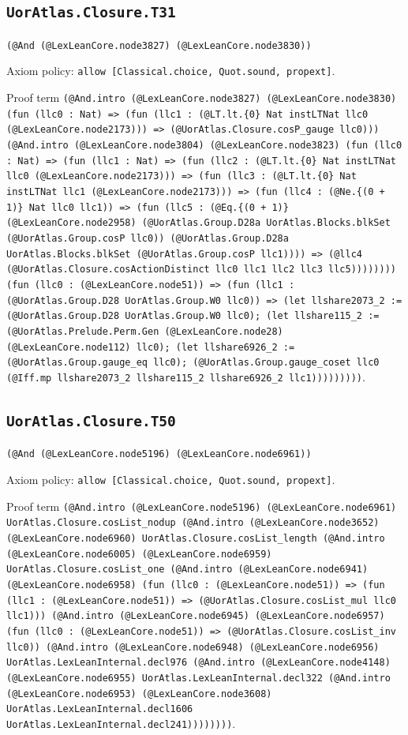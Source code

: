 \documentclass[11pt]{article}
\begin{document}
\subsection*{\texttt{UorAtlas.Closure.T31}}
\noindent\texttt{(@And (@LexLeanCore.node3827) (@LexLeanCore.node3830))}\par
\noindent Axiom policy: \texttt{allow [Classical.choice, Quot.sound, propext]}.\par
\noindent Proof term \texttt{(@And.intro (@LexLeanCore.node3827) (@LexLeanCore.node3830) (fun (llc0 : Nat) => (fun (llc1 : (@LT.lt.\{0\} Nat instLTNat llc0 (@LexLeanCore.node2173))) => (@UorAtlas.Closure.cosP\_gauge llc0))) (@And.intro (@LexLeanCore.node3804) (@LexLeanCore.node3823) (fun (llc0 : Nat) => (fun (llc1 : Nat) => (fun (llc2 : (@LT.lt.\{0\} Nat instLTNat llc0 (@LexLeanCore.node2173))) => (fun (llc3 : (@LT.lt.\{0\} Nat instLTNat llc1 (@LexLeanCore.node2173))) => (fun (llc4 : (@Ne.\{(0 + 1)\} Nat llc0 llc1)) => (fun (llc5 : (@Eq.\{(0 + 1)\} (@LexLeanCore.node2958) (@UorAtlas.Group.D28a UorAtlas.Blocks.blkSet (@UorAtlas.Group.cosP llc0)) (@UorAtlas.Group.D28a UorAtlas.Blocks.blkSet (@UorAtlas.Group.cosP llc1)))) => (@llc4 (@UorAtlas.Closure.cosActionDistinct llc0 llc1 llc2 llc3 llc5)))))))) (fun (llc0 : (@LexLeanCore.node51)) => (fun (llc1 : (@UorAtlas.Group.D28 UorAtlas.Group.W0 llc0)) => (let llshare2073\_2 := (@UorAtlas.Group.D28 UorAtlas.Group.W0 llc0); (let llshare115\_2 := (@UorAtlas.Prelude.Perm.Gen (@LexLeanCore.node28) (@LexLeanCore.node112) llc0); (let llshare6926\_2 := (@UorAtlas.Group.gauge\_eq llc0); (@UorAtlas.Group.gauge\_coset llc0 (@Iff.mp llshare2073\_2 llshare115\_2 llshare6926\_2 llc1)))))))))}.\par
\subsection*{\texttt{UorAtlas.Closure.T50}}
\noindent\texttt{(@And (@LexLeanCore.node5196) (@LexLeanCore.node6961))}\par
\noindent Axiom policy: \texttt{allow [Classical.choice, Quot.sound, propext]}.\par
\noindent Proof term \texttt{(@And.intro (@LexLeanCore.node5196) (@LexLeanCore.node6961) UorAtlas.Closure.cosList\_nodup (@And.intro (@LexLeanCore.node3652) (@LexLeanCore.node6960) UorAtlas.Closure.cosList\_length (@And.intro (@LexLeanCore.node6005) (@LexLeanCore.node6959) UorAtlas.Closure.cosList\_one (@And.intro (@LexLeanCore.node6941) (@LexLeanCore.node6958) (fun (llc0 : (@LexLeanCore.node51)) => (fun (llc1 : (@LexLeanCore.node51)) => (@UorAtlas.Closure.cosList\_mul llc0 llc1))) (@And.intro (@LexLeanCore.node6945) (@LexLeanCore.node6957) (fun (llc0 : (@LexLeanCore.node51)) => (@UorAtlas.Closure.cosList\_inv llc0)) (@And.intro (@LexLeanCore.node6948) (@LexLeanCore.node6956) UorAtlas.LexLeanInternal.decl976 (@And.intro (@LexLeanCore.node4148) (@LexLeanCore.node6955) UorAtlas.LexLeanInternal.decl322 (@And.intro (@LexLeanCore.node6953) (@LexLeanCore.node3608) UorAtlas.LexLeanInternal.decl1606 UorAtlas.LexLeanInternal.decl241))))))))}.\par
\end{document}
